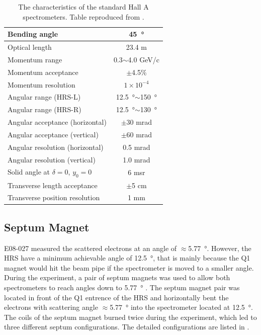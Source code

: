 \begin{table}[p!]
  \centering
  \begin{tabular}{|l|c|}
    \hline\hline
    Bending angle & \SI{45}{\degree} \\ \hline
    Optical length & 23.4 m \\ \hline
    Momentum range & 0.3$\sim$4.0 GeV/c \\ \hline
    Momentum acceptance & $\pm$4.5\% \\ \hline
    Momentum resolution & $1\times10^{-4}$ \\ \hline
    Angular range (HRS-L) & \SI{12.5}{\degree}$\sim$\SI{150}{\degree} \\ \hline
    Angular range (HRS-R) & \SI{12.5}{\degree}$\sim$\SI{130}{\degree} \\ \hline
    Angular acceptance (horizontal) & $\pm$30 mrad \\ \hline
    Angular acceptance (vertical) & $\pm$60 mrad \\ \hline
    Angular resolution (horizontal) & 0.5 mrad \\ \hline
    Angular resolution (vertical) & 1.0 mrad \\ \hline
    Solid angle at $\delta=0$, $y_0=0$ & 6 msr \\ \hline
    Transverse length acceptance & $\pm$5 cm \\ \hline
    Transverse position resolution & 1 mm \\ \hline
  \end{tabular}
  \caption[The characteristics of the HRS.]{The characteristics of the standard Hall A spectrometers. Table reproduced from \cite{Alcorn2004}. \label{C5S4T1}}
\end{table}

\subsection{Septum Magnet}
\label{C5S4SS1}

E08-027 measured the scattered electrons at an angle of $\approx$\SI{5.77}{\degree}. However, the HRS have a minimum achievable angle of \SI{12.5}{\degree}, that is mainly because the Q1 magnet would hit the beam pipe if the spectrometer is moved to a smaller angle. During the experiment, a pair of septum magnets was used to allow both spectrometers to reach angles down to \SI{5.77}{\degree} \cite{G2P}. The septum magnet pair was located in front of the Q1 entrence of the HRS and horizontally bent the electrons with scattering angle $\approx$\SI{5.77}{\degree} into the spectrometer located at \SI{12.5}{\degree}. The coils of the septum magnet burned twice during the experiment, which led to three different septum configurations. The detailed configurations are listed in .

